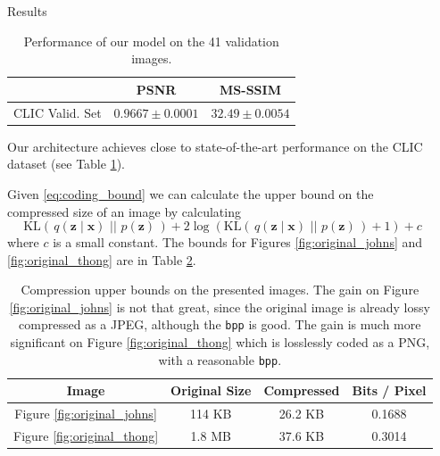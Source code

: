 \documentclass[final]{beamer}
\newlength{\onecolwid}
\newlength{\twocolwid}
\renewcommand{\vec}[1]{\mathbf{#1}}
\newcommand{\KL}[2]{\mathrm{KL}\left(\,#1\,\,||\,\,#2\,\right)}
\begin{document}
\begin{frame}[t]
\begin{columns}[t]
\begin{column}{\twocolwid}
\begin{columns}[t,totalwidth=\twocolwid]
\begin{column}{\onecolwid}
\end{column} %

\begin{column}{\onecolwid} %

\begin{block}{Results}
  \begin{table}[H]
    \begin{tabular}{|c|c|c|}
      \hline
      & \textbf{PSNR} & \textbf{MS-SSIM} \\ \hline
      CLIC Valid. Set &  $0.9667 \pm 0.0001$ & $32.49 \pm 0.0054$ \\ \hline
    \end{tabular}
    \caption{Performance of our model on the 41 validation images.}
    \label{tab:reconstruction_metrics}
  \end{table}
\indent Our architecture achieves close to state-of-the-art performance on the
CLIC dataset (see Table \ref{tab:reconstruction_metrics}).

\indent Given \ref{eq:coding_bound} we can calculate the upper bound on the
compressed size of an image by calculating 
\begin{equation}
  \KL{q(\vec{z} \mid \vec{x})}{p(\vec{z})} +
  2\log(\KL{q(\vec{z} \mid \vec{x})}{p(\vec{z})} + 1) + c
\end{equation}
where $c$ is a small constant. The bounds for Figures \ref{fig:original_johns}
and \ref{fig:original_thong} are in Table \ref{tab:compression_bounds}.
  \begin{table}[H]
    \begin{tabular}{|c|c|c|c|}
      \hline
      \textbf{Image} & \textbf{Original Size} & \textbf{Compressed} & \textbf{Bits / Pixel} \\ \hline
      Figure \ref{fig:original_johns} & 114 KB &  26.2 KB & 0.1688 \\ \hline
      Figure \ref{fig:original_thong} & 1.8 MB & 37.6 KB & 0.3014 \\ \hline
    \end{tabular}
    \caption{Compression upper bounds on the presented images. The gain on
      Figure \ref{fig:original_johns} is not that great, since the original
      image is already lossy compressed as a JPEG, although the \texttt{bpp} is
      good. The gain is much more significant on Figure
      \ref{fig:original_thong} which is losslessly coded as a PNG,
      with a reasonable \texttt{bpp}.}
    \label{tab:compression_bounds}
  \end{table}
\end{block}



\end{column}
\end{columns}
\end{column}
\end{columns}
\end{frame}
\end{document}
